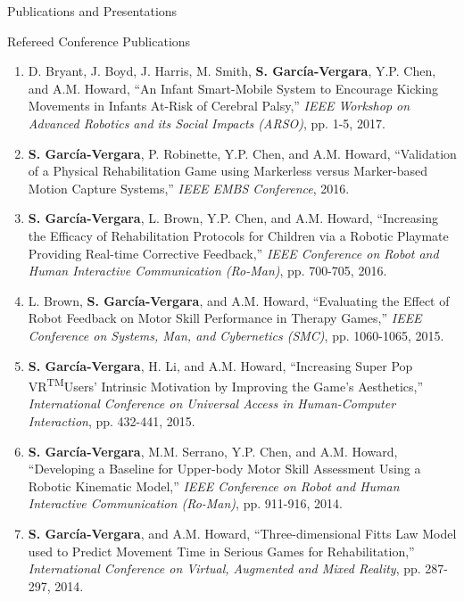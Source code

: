 \documentclass{resume} %
\newcommand{\sectionspace}{\vspace{3mm}}
\newcommand{\Sergio}{\textbf{S. Garc\'{i}a-Vergara}}
\newcommand{\SuperPop}{Super Pop VR\textsuperscript{TM}\space}
\begin{document}
\begin{rSection}{Publications and Presentations}
\sectionspace

\begin{rSubsection}{Refereed Conference Publications}{}{}{}
\item
\begin{enumerate}

\item D. Bryant, J. Boyd, J. Harris, M. Smith, \Sergio, Y.P. Chen, and
  A.M. Howard, ``An Infant Smart-Mobile System to Encourage Kicking Movements in
  Infants At-Risk of Cerebral Palsy,'' \textit{IEEE Workshop on Advanced
    Robotics and its Social Impacts (ARSO)}, pp. 1-5, 2017.

\item \Sergio, P. Robinette, Y.P. Chen, and A.M. Howard, ``Validation of a
  Physical Rehabilitation Game using Markerless versus Marker-based Motion
  Capture Systems,'' \textit{IEEE EMBS Conference}, 2016.

\item \Sergio, L. Brown, Y.P. Chen, and A.M. Howard, ``Increasing the Efficacy
  of Rehabilitation Protocols for Children via a Robotic Playmate Providing
  Real-time Corrective Feedback,'' \textit{IEEE Conference on Robot and Human
    Interactive Communication (Ro-Man)}, pp. 700-705, 2016.

\item L. Brown, \Sergio, and A.M. Howard, ``Evaluating the Effect of Robot
  Feedback on Motor Skill Performance in Therapy Games,'' \textit{IEEE
    Conference on Systems, Man, and Cybernetics (SMC)}, pp. 1060-1065, 2015.

\item \Sergio, H. Li, and A.M. Howard, ``Increasing \SuperPop Users' Intrinsic
  Motivation by Improving the Game's Aesthetics,'' \textit{International
    Conference on Universal Access in Human-Computer Interaction}, pp. 432-441,
  2015.

\item \Sergio, M.M. Serrano, Y.P. Chen, and A.M. Howard, ``Developing a Baseline
  for Upper-body Motor Skill Assessment Using a Robotic Kinematic Model,''
  \textit{IEEE Conference on Robot and Human Interactive Communication
    (Ro-Man)}, pp. 911-916, 2014.

\item \Sergio, and A.M. Howard, ``Three-dimensional Fitts Law Model used to
  Predict Movement Time in Serious Games for Rehabilitation,''
  \textit{International Conference on Virtual, Augmented and Mixed Reality},
  pp. 287-297, 2014.


\end{enumerate}
\end{rSubsection}
\end{rSection}
\end{document}
